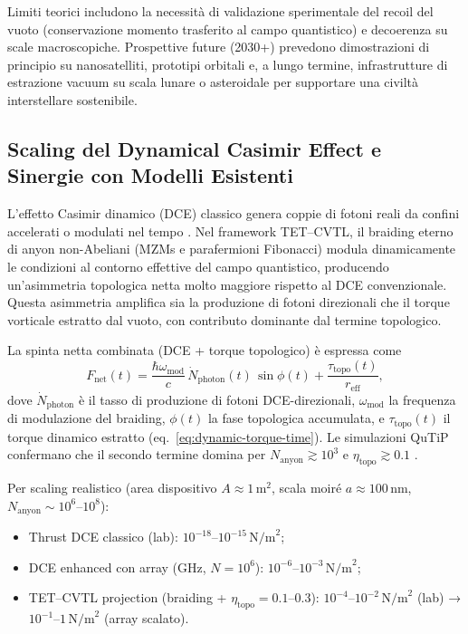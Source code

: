 \documentclass[11pt,a4paper]{article}
\let\oldcite\cite
\renewcommand{\cite}{\protect\oldcite}
\theoremstyle{plain}
\theoremstyle{definition}
\begin{document}
Limiti teorici includono la necessità di validazione sperimentale del recoil del vuoto (conservazione momento trasferito al campo quantistico) e decoerenza su scale macroscopiche. Prospettive future (2030+) prevedono dimostrazioni di principio su nanosatelliti, prototipi orbitali e, a lungo termine, infrastrutture di estrazione vacuum su scala lunare o asteroidale per supportare una civiltà interstellare sostenibile.






\subsection{Scaling del Dynamical Casimir Effect e Sinergie con Modelli Esistenti}

L'effetto Casimir dinamico (DCE) classico genera coppie di fotoni reali da confini accelerati o modulati nel tempo \cite{Moore1970, Wilson2011}. Nel framework TET--CVTL, il braiding eterno di anyon non-Abeliani (MZMs e parafermioni Fibonacci) modula dinamicamente le condizioni al contorno effettive del campo quantistico, producendo un'asimmetria topologica netta molto maggiore rispetto al DCE convenzionale. Questa asimmetria amplifica sia la produzione di fotoni direzionali che il torque vorticale estratto dal vuoto, con contributo dominante dal termine topologico.

\vspace{0.4cm}


La spinta netta combinata (DCE + torque topologico) è espressa come
\begin{equation}
F_{\mathrm{net}}(t) = \frac{\hbar \omega_{\mathrm{mod}}}{c} \, \dot{N}_{\mathrm{photon}}(t) \, \sin\phi(t) + \frac{\tau_{\mathrm{topo}}(t)}{r_{\mathrm{eff}}},
\label{eq:combined-thrust}
\end{equation}
dove $\dot{N}_{\mathrm{photon}}$ è il tasso di produzione di fotoni DCE-direzionali, $\omega_{\mathrm{mod}}$ la frequenza di modulazione del braiding, $\phi(t)$ la fase topologica accumulata, e $\tau_{\mathrm{topo}}(t)$ il torque dinamico estratto (eq.~\eqref{eq:dynamic-torque-time}). Le simulazioni QuTiP confermano che il secondo termine domina per $N_{\mathrm{anyon}} \gtrsim 10^3$ e $\eta_{\mathrm{topo}} \gtrsim 0.1$ \cite{PhysSoliman2026b}.

\vspace{0.4cm}

Per scaling realistico (area dispositivo $A \approx 1\,\mathrm{m}^2$, scala moiré $a \approx 100\,\mathrm{nm}$, $N_{\mathrm{anyon}} \sim 10^6$--$10^8$):
\begin{itemize}
    \item Thrust DCE classico (lab): $10^{-18}$--$10^{-15}\,\mathrm{N/m}^2$;
    \item DCE enhanced con array (GHz, $N=10^6$): $10^{-6}$--$10^{-3}\,\mathrm{N/m}^2$;
    \item TET--CVTL projection (braiding + $\eta_{\mathrm{topo}} = 0.1$–$0.3$): $10^{-4}$--$10^{-2}\,\mathrm{N/m}^2$ (lab) → $10^{-1}$--$1\,\mathrm{N/m}^2$ (array scalato).
\end{itemize}
\end{document}
